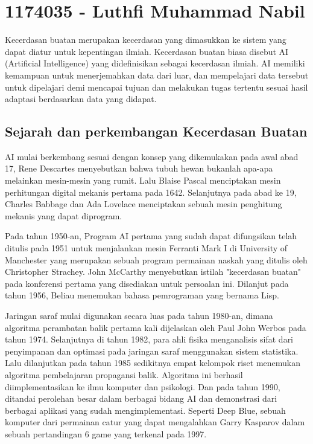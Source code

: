 \section{1174035 - Luthfi Muhammad Nabil}
Kecerdasan buatan merupakan kecerdasan yang dimasukkan ke sistem yang dapat diatur untuk kepentingan ilmiah. Kecerdasan buatan biasa disebut AI (Artificial Intelligence) yang didefinisikan sebagai kecerdasan ilmiah. AI memiliki kemampuan untuk menerjemahkan data dari luar, dan mempelajari data tersebut untuk dipelajari demi mencapai tujuan dan melakukan tugas tertentu sesuai hasil adaptasi berdasarkan data yang didapat. 

\subsection{Sejarah dan perkembangan Kecerdasan Buatan}
AI mulai berkembang sesuai dengan konsep yang dikemukakan pada awal abad 17, Rene Descartes menyebutkan bahwa tubuh hewan bukanlah apa-apa melainkan mesin-mesin yang rumit. Lalu Blaise Pascal menciptakan mesin perhitungan digital mekanis pertama pada 1642. Selanjutnya pada abad ke 19, Charles Babbage dan Ada Lovelace menciptakan sebuah mesin penghitung mekanis yang dapat diprogram.

Pada tahun 1950-an, Program AI pertama yang sudah dapat difungsikan telah ditulis pada 1951 untuk menjalankan mesin Ferranti Mark I di University of Manchester yang merupakan sebuah program permainan naskah yang ditulis oleh Christopher Strachey. John McCarthy menyebutkan istilah "kecerdasan buatan" pada konferensi pertama yang disediakan untuk persoalan ini. Dilanjut pada tahun 1956, Beliau menemukan bahasa pemrograman yang bernama Lisp.

Jaringan saraf mulai digunakan secara luas pada tahun 1980-an, dimana algoritma perambatan balik pertama kali dijelaskan oleh Paul John Werbos pada tahun 1974. Selanjutnya di tahun 1982, para ahli fisika menganalisis sifat dari penyimpanan dan optimasi pada jaringan saraf menggunakan sistem statistika. Lalu dilanjutkan pada tahun 1985 sedikitnya empat kelompok riset menemukan algoritma pembelajaran propagansi balik. Algoritma ini berhasil diimplementasikan ke ilmu komputer dan psikologi. Dan pada tahun 1990, ditandai perolehan besar dalam berbagai bidang AI dan demonstrasi dari berbagai aplikasi yang sudah mengimplementasi. Seperti Deep Blue, sebuah komputer dari permainan catur yang dapat mengalahkan Garry Kasparov dalam sebuah pertandingan 6 game yang terkenal pada 1997. 

